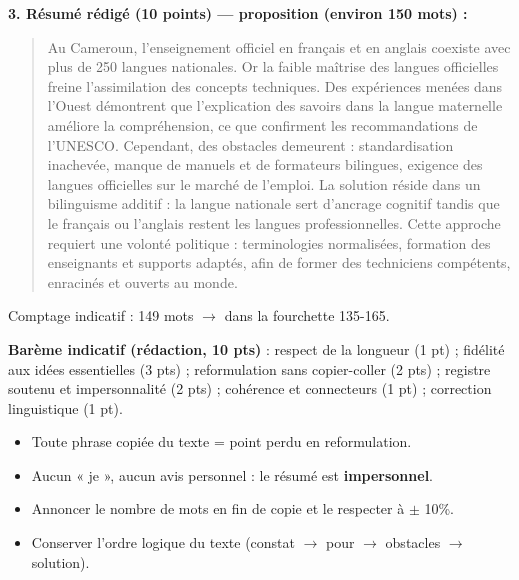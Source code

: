 \documentclass[11pt]{article}
\begin{document}
\begin{corrige}
\textbf{3. Résumé rédigé (10 points) — proposition (environ 150 mots) :}

\begin{quote}
Au Cameroun, l'enseignement officiel en français et en anglais coexiste avec plus de 250 langues nationales. Or la faible maîtrise des langues officielles freine l'assimilation des concepts techniques. Des expériences menées dans l'Ouest démontrent que l'explication des savoirs dans la langue maternelle améliore la compréhension, ce que confirment les recommandations de l'UNESCO. Cependant, des obstacles demeurent : standardisation inachevée, manque de manuels et de formateurs bilingues, exigence des langues officielles sur le marché de l'emploi. La solution réside dans un bilinguisme additif : la langue nationale sert d'ancrage cognitif tandis que le français ou l'anglais restent les langues professionnelles. Cette approche requiert une volonté politique : terminologies normalisées, formation des enseignants et supports adaptés, afin de former des techniciens compétents, enracinés et ouverts au monde.
\end{quote}

Comptage indicatif : 149 mots $\rightarrow$ dans la fourchette 135-165.

\textbf{Barème indicatif (rédaction, 10 pts)} : respect de la longueur (1 pt) ; fidélité aux idées essentielles (3 pts) ; reformulation sans copier-coller (2 pts) ; registre soutenu et impersonnalité (2 pts) ; cohérence et connecteurs (1 pt) ; correction linguistique (1 pt).
\end{corrige}

\begin{attention}
\begin{itemize}
    \item Toute phrase copiée du texte = point perdu en reformulation.
    \item Aucun « je », aucun avis personnel : le résumé est \textbf{impersonnel}.
    \item Annoncer le nombre de mots en fin de copie et le respecter à $\pm$ 10\%.
    \item Conserver l'ordre logique du texte (constat $\rightarrow$ pour $\rightarrow$ obstacles $\rightarrow$ solution).
\end{itemize}
\end{attention}
\end{document}
